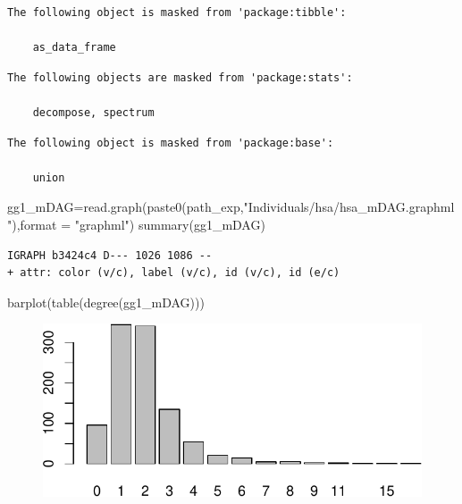 \documentclass[
  letterpaper,
  DIV=11,
  numbers=noendperiod]{scrreprt}
\newenvironment{Shaded}{\begin{snugshade}}{\end{snugshade}}
\newcommand{\AttributeTok}[1]{\textcolor[rgb]{0.40,0.45,0.13}{#1}}
\newcommand{\FunctionTok}[1]{\textcolor[rgb]{0.28,0.35,0.67}{#1}}
\newcommand{\NormalTok}[1]{\textcolor[rgb]{0.00,0.23,0.31}{#1}}
\newcommand{\OtherTok}[1]{\textcolor[rgb]{0.00,0.23,0.31}{#1}}
\newcommand{\StringTok}[1]{\textcolor[rgb]{0.13,0.47,0.30}{#1}}
\begin{document}
\begin{verbatim}
The following object is masked from 'package:tibble':

    as_data_frame
\end{verbatim}

\begin{verbatim}
The following objects are masked from 'package:stats':

    decompose, spectrum
\end{verbatim}

\begin{verbatim}
The following object is masked from 'package:base':

    union
\end{verbatim}

\begin{Shaded}
\begin{Highlighting}[]
\NormalTok{gg1\_mDAG}\OtherTok{=}\FunctionTok{read.graph}\NormalTok{(}\FunctionTok{paste0}\NormalTok{(path\_exp,}\StringTok{"Individuals/hsa/hsa\_mDAG.graphml"}\NormalTok{),}\AttributeTok{format =} \StringTok{"graphml"}\NormalTok{)}
\FunctionTok{summary}\NormalTok{(gg1\_mDAG)}
\end{Highlighting}
\end{Shaded}

\begin{verbatim}
IGRAPH b3424c4 D--- 1026 1086 -- 
+ attr: color (v/c), label (v/c), id (v/c), id (e/c)
\end{verbatim}

\begin{Shaded}
\begin{Highlighting}[]
\FunctionTok{barplot}\NormalTok{(}\FunctionTok{table}\NormalTok{(}\FunctionTok{degree}\NormalTok{(gg1\_mDAG)))}
\end{Highlighting}
\end{Shaded}

\begin{figure}[H]

{\centering \includegraphics{./data_load_files/figure-pdf/unnamed-chunk-12-1.pdf}

}

\end{figure}
\end{document}
